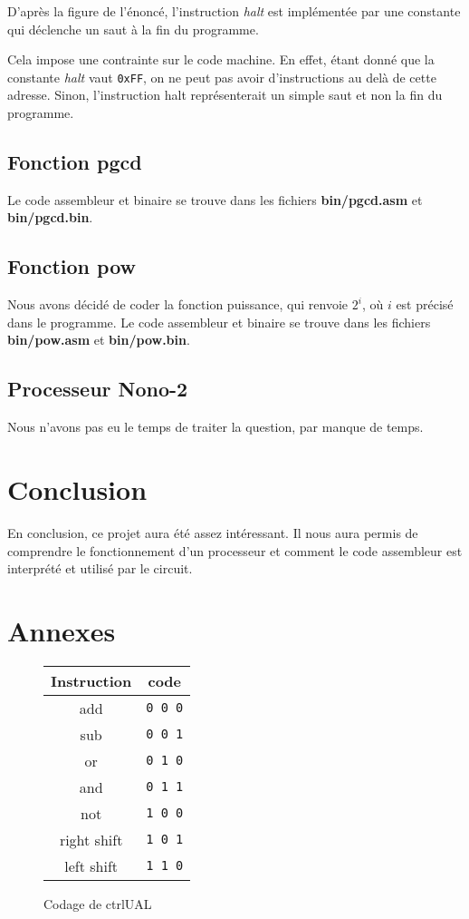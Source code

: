 \documentclass[10pt,a4paper]{article}
\begin{document}
D'après la figure de l'énoncé, l'instruction \textit{halt} est implémentée par une constante qui déclenche un saut à la fin du programme.

Cela impose une contrainte sur le code machine. En effet, étant donné que la constante \textit{halt} vaut \verb|0xFF|, on ne peut pas avoir d'instructions au delà de cette adresse. Sinon, l'instruction halt représenterait un simple saut et non la fin du programme.

\subsection{Fonction pgcd}

Le code assembleur et binaire se trouve dans les fichiers \textbf{bin/pgcd.asm} et \textbf{bin/pgcd.bin}.

\subsection{Fonction pow}

Nous avons décidé de coder la fonction puissance, qui renvoie $2^i$, où $i$ est précisé dans le programme. Le code assembleur et binaire se trouve dans les fichiers \textbf{bin/pow.asm} et \textbf{bin/pow.bin}.

\subsection{Processeur Nono-2}

Nous n'avons pas eu le temps de traiter la question, par manque de temps.

\section{Conclusion}

En conclusion, ce projet aura été assez intéressant. Il nous aura permis de comprendre le fonctionnement d'un processeur et comment le code assembleur est interprété et utilisé par le circuit.

\section{Annexes}

\begin{figure}[h]
\centering
\begin{tabular}{|c|c|}
 \hline
 \textbf{Instruction} & \textbf{code} \\
 \hline
 add & \verb|0 0 0| \\
 \hline
 sub & \verb|0 0 1| \\
 \hline
 or & \verb|0 1 0| \\
 \hline
 and & \verb|0 1 1| \\
 \hline
 not & \verb|1 0 0| \\
 \hline
 right shift & \verb|1 0 1| \\
 \hline
 left shift & \verb|1 1 0| \\
 \hline
\end{tabular}
\caption{Codage de ctrlUAL}
\label{code_ctrlUAL}
\end{figure}
\end{document}
